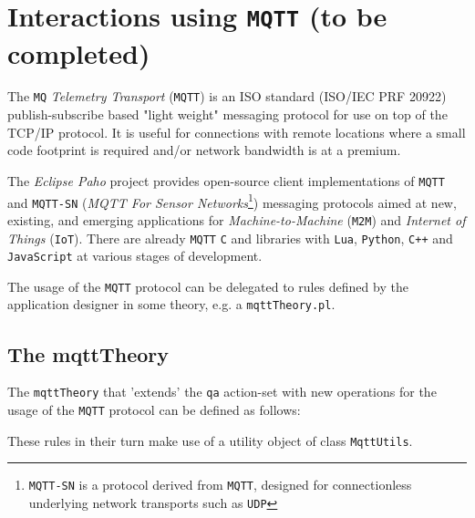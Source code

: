  





 

\newpage  
	\section{Interactions using \texttt{MQTT} (to be completed)}
 
The \texttt{MQ} \textit{Telemetry Transport} (\texttt{MQTT}) is an ISO standard (ISO/IEC PRF 20922) publish-subscribe based "light weight" messaging protocol for use on top of the TCP/IP protocol. It is useful for connections with remote locations where a small code footprint is required and/or network bandwidth is at a premium.

The \textit{Eclipse Paho} project provides open-source client implementations of \texttt{MQTT} and \texttt{MQTT-SN} (\textit{MQTT For Sensor Networks}\footnote{\texttt{MQTT-SN} is a protocol derived from \texttt{MQTT}, designed for connectionless underlying network transports such as \texttt{UDP}}) messaging protocols aimed at new, existing, and emerging applications for \textit{Machine-to-Machine} (\texttt{M2M}) and \textit{Internet of Things} (\texttt{IoT}). There are already \texttt{MQTT} \texttt{C} and \java{} libraries with \texttt{Lua}, \texttt{Python}, \texttt{C++} and \texttt{JavaScript} at various stages of development.


The usage of the \texttt{MQTT} protocol can be delegated to rules defined by the application designer in some theory, e.g. a \texttt{mqttTheory.pl}. 

\subsection{The mqttTheory}
The \texttt{mqttTheory} that 'extends' the \texttt{qa} action-set with new operations for the usage of the \texttt{MQTT} protocol can be defined as follows:




These rules in their turn make use of a \java{} utility object of class \texttt{MqttUtils}.


